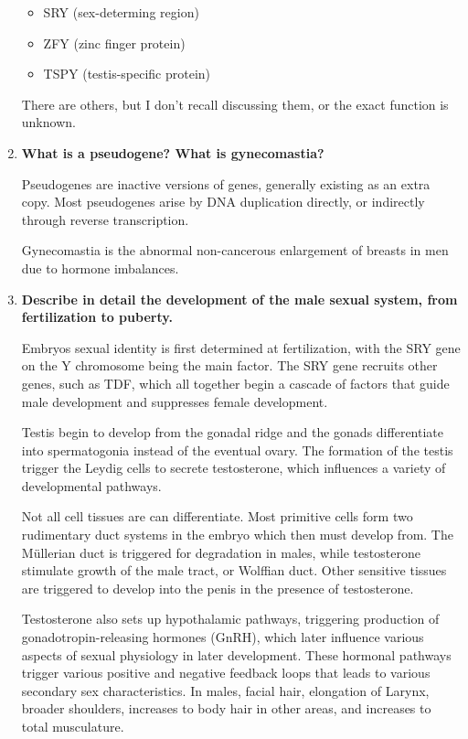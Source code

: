 \documentclass[plain,basic]{inVerba-notes}
\begin{document}
\begin{enumerate}
    \begin{itemize}
      \item SRY (sex-determing region)
      \item ZFY (zinc finger protein)
      \item TSPY (testis-specific protein)
    \end{itemize}

    There are others, but I don't recall discussing them, or the exact function is unknown.


    \item \textbf{What is a pseudogene? What is gynecomastia?}
    
    Pseudogenes are inactive versions of genes, generally existing as an extra copy. Most pseudogenes arise by DNA duplication directly, or indirectly through reverse transcription.

    Gynecomastia is the abnormal non-cancerous enlargement of breasts in men due to hormone imbalances. 

    \item \textbf{Describe in detail the development of the male sexual system, from fertilization to puberty.}
    
    Embryos sexual identity is first determined at fertilization, with the SRY gene on the Y chromosome being the main factor. The SRY gene recruits other genes, such as TDF, which all together begin a cascade of factors that guide male development and suppresses female development.

    Testis begin to develop from the gonadal ridge and the gonads differentiate into spermatogonia instead of the eventual ovary. The formation of the testis trigger the Leydig cells to secrete testosterone, which influences a variety of developmental pathways.
    
    Not all cell tissues are can differentiate. Most primitive cells form two rudimentary duct systems in the embryo which then must develop from. The Müllerian duct is triggered for degradation in males, while testosterone stimulate growth of the male tract, or Wolffian duct. Other sensitive tissues are triggered to develop into the penis in the presence of testosterone.

    Testosterone also sets up hypothalamic pathways, triggering production of gonadotropin-releasing hormones (GnRH), which later influence various aspects of sexual physiology in later development. These hormonal pathways trigger various positive and negative feedback loops that leads to various secondary sex characteristics. In males, facial hair, elongation of Larynx, broader shoulders, increases to body hair in other areas, and increases to total musculature. 


\end{enumerate}
\end{document}
